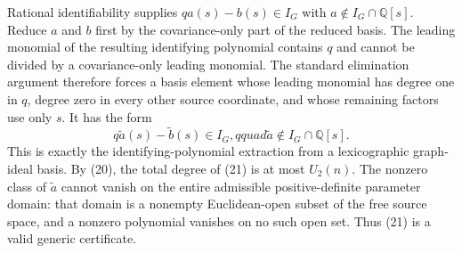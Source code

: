 Rational identifiability supplies \(qa(s)-b(s)\in I_G\) with \(a\notin I_G\cap\mathbb Q[s]\).  Reduce \(a\) and \(b\) first by the covariance-only part of the reduced basis.  The leading monomial of the resulting identifying polynomial contains \(q\) and cannot be divided by a covariance-only leading monomial.  The standard elimination argument therefore forces a basis element whose leading monomial has degree one in \(q\), degree zero in every other source coordinate, and whose remaining factors use only \(s\).  It has the form
\[
 q\widetilde a(s)-\widetilde b(s)\in I_G,qquad
 \widetilde a\notin I_G\cap\mathbb Q[s]. \tag{21}
\]
This is exactly the identifying-polynomial extraction from a lexicographic graph-ideal basis.  By (20), the total degree of (21) is at most \(U_2(n)\).  The nonzero class of \(\widetilde a\) cannot vanish on the entire admissible positive-definite parameter domain: that domain is a nonempty Euclidean-open subset of the free source space, and a nonzero polynomial vanishes on no such open set.  Thus (21) is a valid generic certificate.

